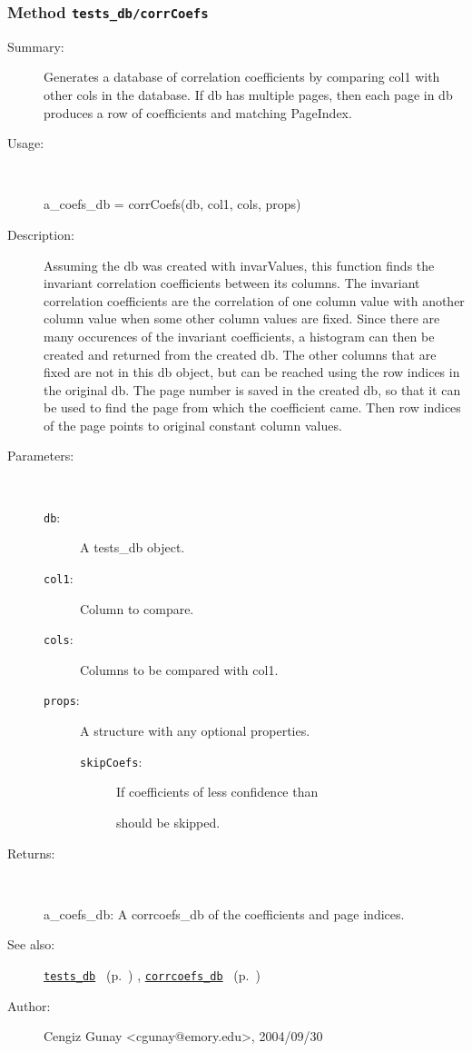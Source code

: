 \subsubsection[Method \texttt{corrCoefs}]{Method \texttt{tests\_db/corrCoefs}}%
%
\label{ref_tests_db__corrCoefs}%
\hypertarget{ref_tests_db__corrCoefs}{}%
\begin{description}
\item[Summary:]Generates a database of correlation coefficients 
		by comparing col1 with other cols in the database. 
		If db has multiple pages, then each page in db 
		produces a row of coefficients and matching PageIndex.
%
\item[Usage:]~%
\begin{lyxcode}%
a\_coefs\_db = corrCoefs(db, col1, cols, props)
%
\end{lyxcode}%
%
\item[Description:]%
Assuming the db was created with invarValues, this function finds the
 invariant correlation coefficients between its columns. 
 The invariant correlation coefficients are the correlation of one column
 value with another column value when some other column values are fixed.
 Since there are many occurences of the invariant coefficients, a histogram
 can then be created and returned from the created db. The other
 columns that are fixed are not in this db object, but can be reached 
 using the row indices in the original db. The page number is saved in the 
 created db, so that it can be used to find the page from which the 
 coefficient came. Then row indices of the page points to original 
 constant column values.
\item[Parameters:]~
\begin{description}%
\item[\texttt{db}:]
 A tests\_db object.
\item[\texttt{col1}:]
 Column to compare.
\item[\texttt{cols}:]
 Columns to be compared with col1.
\item[\texttt{props}:]
 A structure with any optional properties.
\begin{description}%
\item[\texttt{skipCoefs}:]
 If coefficients of less confidence than %

should be skipped.\end{description}%
\end{description}%
%
\item[Returns:]~

	a\_coefs\_db: A corrcoefs\_db of the coefficients and page indices.
%
%
\item[See also:]%
\hyperlink{ref_tests_db}{\texttt{tests\_db}}%
\ (p.~\pageref{ref_tests_db})%
%
, \hyperlink{ref_corrcoefs_db}{\texttt{corrcoefs\_db}}%
\ (p.~\pageref{ref_corrcoefs_db})%
%
%
\item[Author:]%
Cengiz Gunay <cgunay@emory.edu>, 2004/09/30%
\end{description}
\methodline%
